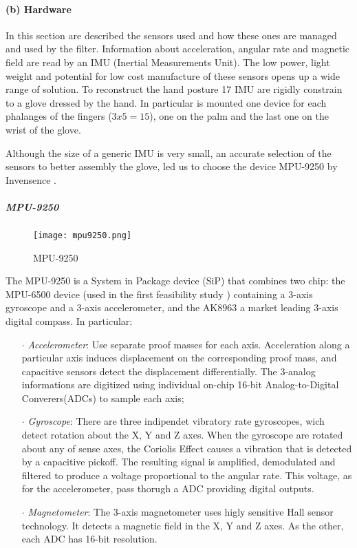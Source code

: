 \paragraph{(b) Hardware}

In this section are described the sensors used and how these ones are managed and used by the filter. Information about acceleration, angular rate and  magnetic field are read by an IMU (Inertial Measurements Unit).  The low power, light weight and potential for low cost manufacture of these sensors opens up a wide range of solution. To reconstruct the hand posture 17 IMU are rigidly constrain to a glove dressed by the hand. In particular is mounted one device for each phalanges of the fingers ($3x5=15$), one on the palm and the last one on the wrist of the glove. 

Although the size of a generic IMU is very small, an accurate selection of the sensors to better assembly the glove, led us to choose the device MPU-9250 by Invensence \cite{MPU9250}.  \\

\subparagraph{MPU-9250}

\begin{figure}[h]
\centering
\texttt{[image: mpu9250.png]}
\caption{MPU-9250}
\label{fig:mpu9250}
\end{figure}

The MPU-9250 is a System in Package device (SiP) that combines two chip: the MPU-6500 device (used in the first feasibility study \cite{Santaera:ICRA:2015}) containing a 3-axis gyroscope and a 3-axis accelerometer, and the AK8963  a market leading 3-axis digital compass. In particular:

\begin{itemize}
\item[$\cdot$] \textit{Accelerometer}: Use separate proof masses for each axis. Acceleration along a particular axis induces displacement on the corresponding proof mass, and capacitive sensors detect the displacement differentially. The 3-analog informations are digitized using individual on-chip 16-bit Analog-to-Digital Converers(ADCs) to sample each axis;

 \item[$\cdot$] \textit{Gyroscope}: There are three indipendet vibratory rate gyroscopes, wich detect rotation about the X, Y and Z axes. When the gyroscope are rotated about any of sense axes, the Coriolis Effect causes a vibration that is detected by a capacitive pickoff. The resulting signal is amplified, demodulated and filtered to produce a voltage proportional to the angular rate. This voltage, as for the accelerometer, pass thorugh a ADC providing digital outputs.

 \item[$\cdot$] \textit{Magnetometer}: The 3-axis magnetometer uses higly sensitive Hall sensor technology. It detects a magnetic field in the X, Y and Z axes. As the other, each ADC has 16-bit resolution. 
\end{itemize}


